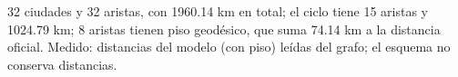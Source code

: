 {32 ciudades y 32 aristas, con 1960.14 km en total; el ciclo tiene 15 aristas y 1024.79 km; 8 aristas tienen piso geodésico, que suma 74.14 km a la distancia oficial.}
{Medido: distancias del modelo (con piso) leídas del grafo; el esquema no conserva distancias.}
